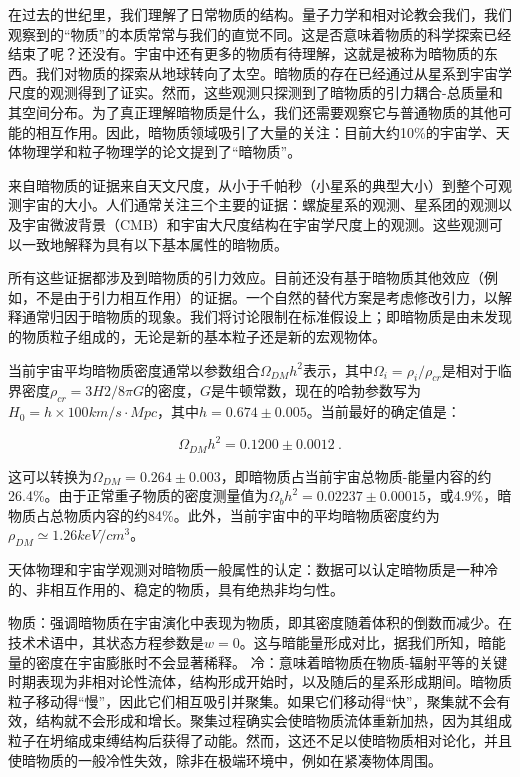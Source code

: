 
在过去的世纪里，我们理解了日常物质的结构。量子力学和相对论教会我们，我们观察到的“物质”的本质常常与我们的直觉不同。这是否意味着物质的科学探索已经结束了呢？还没有。宇宙中还有更多的物质有待理解，这就是被称为暗物质的东西。我们对物质的探索从地球转向了太空。暗物质的存在已经通过从星系到宇宙学尺度的观测得到了证实。然而，这些观测只探测到了暗物质的引力耦合-总质量和其空间分布。为了真正理解暗物质是什么，我们还需要观察它与普通物质的其他可能的相互作用。因此，暗物质领域吸引了大量的关注：目前大约10\%的宇宙学、天体物理学和粒子物理学的论文提到了“暗物质”。

来自暗物质的证据来自天文尺度，从小于千帕秒（小星系的典型大小）到整个可观测宇宙的大小。人们通常关注三个主要的证据：螺旋星系的观测、星系团的观测以及宇宙微波背景（CMB）和宇宙大尺度结构在宇宙学尺度上的观测。这些观测可以一致地解释为具有以下基本属性的暗物质。

所有这些证据都涉及到暗物质的引力效应。目前还没有基于暗物质其他效应（例如，不是由于引力相互作用）的证据。一个自然的替代方案是考虑修改引力，以解释通常归因于暗物质的现象。我们将讨论限制在标准假设上；即暗物质是由未发现的物质粒子组成的，无论是新的基本粒子还是新的宏观物体。

当前宇宙平均暗物质密度通常以参数组合$\Omega_{DM}h^2$表示，其中$\Omega_i = \rho_i/\rho_{cr}$是相对于临界密度$\rho_{cr} = 3H2/8\pi G$的密度，$G$是牛顿常数，现在的哈勃参数写为$H_0 = h \times 100 km/s \cdot Mpc$，其中$h = 0.674 \pm 0.005$。当前最好的确定值是：

\begin{equation}
\Omega_{DM}h^2 = 0.1200 \pm 0.0012~.
\end{equation}

这可以转换为$\Omega_{DM} = 0.264 \pm 0.003$，即暗物质占当前宇宙总物质-能量内容的约26.4\%。由于正常重子物质的密度测量值为$\Omega_b h^2 = 0.02237 \pm 0.00015$，或4.9\%，暗物质占总物质内容的约84\%。此外，当前宇宙中的平均暗物质密度约为$\rho_{DM} \simeq 1.26 keV/ cm^3$。

天体物理和宇宙学观测对暗物质一般属性的认定：数据可以认定暗物质是一种冷的、非相互作用的、稳定的物质，具有绝热非均匀性。

物质：强调暗物质在宇宙演化中表现为物质，即其密度随着体积的倒数而减少。在技术术语中，其状态方程参数是$w = 0$。这与暗能量形成对比，据我们所知，暗能量的密度在宇宙膨胀时不会显著稀释。
冷：意味着暗物质在物质-辐射平等的关键时期表现为非相对论性流体，结构形成开始时，以及随后的星系形成期间。暗物质粒子移动得“慢”，因此它们相互吸引并聚集。如果它们移动得“快”，聚集就不会有效，结构就不会形成和增长。聚集过程确实会使暗物质流体重新加热，因为其组成粒子在坍缩成束缚结构后获得了动能。然而，这还不足以使暗物质相对论化，并且使暗物质的一般冷性失效，除非在极端环境中，例如在紧凑物体周围。

